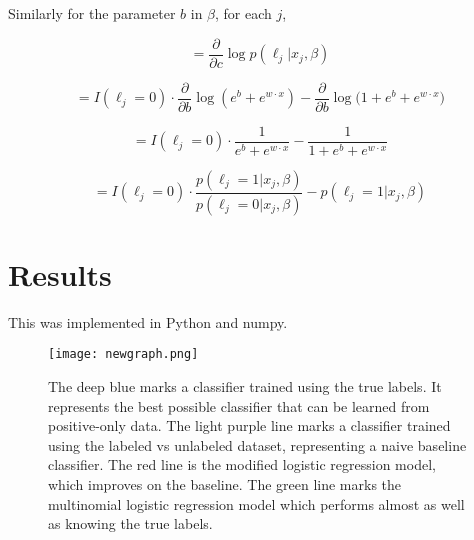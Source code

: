\documentclass[]{article}
\begin{document}
Similarly for the parameter $b$ in $\beta$, for each $j$,


$$
 = \frac{\partial}{\partial c}\log{p(\ell_j | x_j, \beta)}
$$


$$
 = I(\ell_j=0) \cdot \frac{\partial}{\partial b}
		\log{  \left( e^b + e^{w \cdot x} \right) }
		- \frac{\partial}{\partial b}
		 \log{\bigg(
			1 + e^b + e^{w \cdot x}
		\bigg)}
$$


$$
 = I(\ell_j=0) \cdot
		\frac{1}{e^b + e^{w \cdot x}}
		-
		 \frac{1}{
			1 + e^b + e^{w \cdot x}
		}
$$


$$
 = I(\ell_j=0) \cdot
		\frac{p(\ell_j=1 | x_j,\beta)}{p(\ell_j=0 | x_j,\beta)}
		-
		 p(\ell_j=1 | x_j,\beta)
$$

\section{Results}

This was implemented in Python and numpy.

\label{Reproduce Elkan 2008 graph with generated data (c=0.20)}
\begin{figure}[ht!]
\centering
\texttt{[image: newgraph.png]}
\caption{The deep blue marks a classifier trained using the true labels. It represents the best possible classifier that can be learned from positive-only data. The light purple line marks a classifier trained using the labeled vs unlabeled dataset, representing a naive baseline classifier.  The red line is the modified logistic regression model, which improves on the baseline.  The green line marks the multinomial logistic regression model which performs almost as well as knowing the true labels.}
\end{figure}
\end{document}
